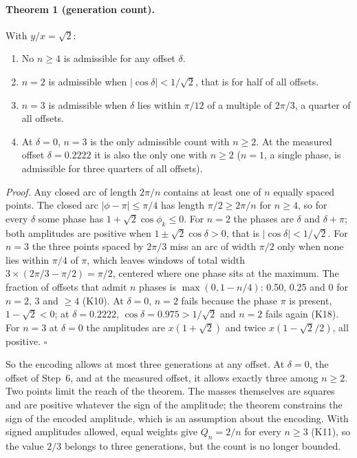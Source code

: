 \paragraph{Theorem 1 (generation count).} With $y/x=\sqrt2$:
\begin{enumerate}
\item No $n\ge4$ is admissible for any offset $\delta$.
\item $n=2$ is admissible when $|\cos\delta|<1/\sqrt2$, that is for half of all offsets.
\item $n=3$ is admissible when $\delta$ lies within $\pi/12$ of a multiple of $2\pi/3$, a quarter of all offsets.
\item At $\delta=0$, $n=3$ is the only admissible count with $n\ge2$. At the measured offset $\delta=0.2222$ it is also the only one with $n\ge2$ ($n=1$, a single phase, is admissible for three quarters of all offsets).
\end{enumerate}
\emph{Proof.} Any closed arc of length $2\pi/n$ contains at least one of $n$ equally spaced points. The closed arc
$|\phi-\pi|\le\pi/4$ has length $\pi/2\ge2\pi/n$ for $n\ge4$, so for every $\delta$ some phase has $1+\sqrt2\cos\phi_k\le0$. For $n=2$ the phases are $\delta$ and $\delta+\pi$; both amplitudes are positive when $1\pm\sqrt2\cos\delta>0$, that is
$|\cos\delta|<1/\sqrt2$. For $n=3$ the three points spaced by $2\pi/3$ miss an arc of width $\pi/2$ only when none lies within $\pi/4$ of $\pi$,
which leaves windows of total width $3\times(2\pi/3-\pi/2)=\pi/2$, centered where one phase sits at the maximum. The fraction of offsets that
admit $n$ phases is $\max(0,1-n/4)$: 0.50, 0.25 and 0 for $n=2$, 3 and $\ge4$ (K10). At $\delta=0$, $n=2$ fails because the phase $\pi$ is
present, $1-\sqrt2<0$; at $\delta=0.2222$, $\cos\delta=0.975>1/\sqrt2$ and $n=2$ fails again (K18). For $n=3$ at $\delta=0$ the amplitudes are
$x(1+\sqrt2)$ and twice $x(1-\sqrt2/2)$, all positive. $\square$ \derived

So the encoding allows at most three generations at any offset. At $\delta=0$, the offset of Step~6, and at the measured
offset, it allows exactly three among $n\ge2$. Two points limit the reach of the theorem. The masses themselves are squares and are positive whatever the
sign of the amplitude; the theorem constrains the sign of the encoded amplitude, which is an assumption about the encoding. \derived{} With signed
amplitudes allowed, equal weights give $Q_n=2/n$ for every $n\ge3$ (K11), so the value $2/3$ belongs to three generations, but the count is no
longer bounded. \calc

